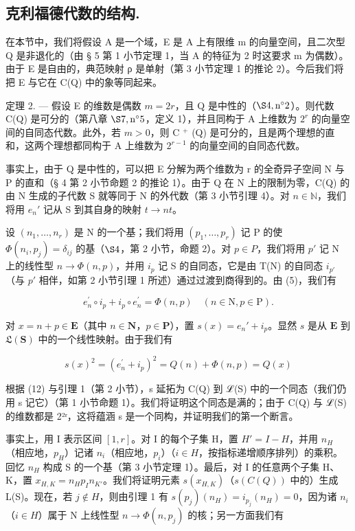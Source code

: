 \subsection{克利福德代数的结构.}

  在本节中，我们将假设 A 是一个域，E 是 A 上有限维 m 的向量空间，且二次型 Q 是非退化的（由 § 5 第 1 小节定理 1，当 A 的特征为 2 时这要求 m 为偶数）。由于 E 是自由的，典范映射 ρ 是单射（第 3 小节定理 1 的推论 2）。今后我们将把 E 与它在 C(Q) 中的象等同起来。

定理 2. --- 假设 E 的维数是偶数 \(m = 2r\)，且 Q 是中性的（\(\S 4, \text{n}^{\circ} 2\)）。则代数 C(Q) 是可分的（第八章 \(\S 7, \text{n}^{\circ} 5\)，定义 1），并且同构于 A 上维数为 \(2^{r}\) 的向量空间的自同态代数。此外，若 \(m > 0\)，则 C \(^{+}\) (Q) 是可分的，且是两个理想的直和，这两个理想都同构于 A 上维数为 \(2^{r-1}\) 的向量空间的自同态代数。

  事实上，由于 Q 是中性的，可以把 E 分解为两个维数为 r 的全奇异子空间 N 与 P 的直和（§ 4 第 2 小节命题 2 的推论 1）。由于 Q 在 N 上的限制为零，C(Q) 的由 N 生成的子代数 S 就等同于 N 的外代数（第 3 小节引理 4）。对 \(n \in \mathbb{N}\)，我们将用 \(e_n'\) 记从 S 到其自身的映射 \(t \to nt\)。

  设 \((n_{1},\ldots,n_{r})\) 是 N 的一个基；我们将用 \((p_{1},\ldots,p_{r})\) 记 P 的使 \(\Phi(n_{i},p_{j})=\delta_{ij}\) 的基（\(\S 4\)，第 2 小节，命题 2）。对 \(p\in P\)，我们将用 \(p'\) 记 N 上的线性型 \(n\to\Phi(n,p)\)，并用 \(i_{p}\) 记 S 的自同态，它是由 T(N) 的自同态 \(i_{p'}\)（与 \(p'\) 相伴，如第 2 小节引理 1 所述）通过过渡到商得到的。由 (5)，我们有

\[
e _ {n} ^ {\prime} \circ i _ {p} + i _ {p} \circ e _ {n} ^ {\prime} = \Phi (n, p) \quad (n \in \mathrm{N}, p \in \mathrm{P}).\tag{12}
\]

  对 \(x = n + p \in \mathbf{E}\)（其中 \(n \in \mathbf{N}\)，\(p \in \mathbf{P}\)），置 \(s(x) = e_n' + i_p\)。显然 \(s\) 是从 \(\mathbf{E}\) 到 \(\mathfrak{L}(\mathbf{S})\) 中的一个线性映射。由于我们有

\[
s (x) ^ {2} = \left(e _ {n} ^ {\prime} + i _ {p}\right) ^ {2} = Q (n) + \Phi (n, p) = Q (x)
\]

  根据 (12) 与引理 1（第 2 小节），s 延拓为 C(Q) 到 ℒ(S) 中的一个同态（我们仍用 s 记它）（第 1 小节命题 1）。我们将证明这个同态是满的；由于 C(Q) 与 ℒ(S) 的维数都是 2²ʳ，这将蕴涵 s 是一个同构，并证明我们的第一个断言。

  事实上，用 I 表示区间 \([1, r]\)。对 I 的每个子集 H，置 \(H' = I - H\)，并用 \(n_{H}\)（相应地，\(p_{H}\)）记诸 \(n_{i}\)（相应地，\(p_{i}\)）（\(i \in H\)，按指标递增顺序排列）的乘积。回忆 \(n_{H}\) 构成 S 的一个基（第 3 小节定理 1）。最后，对 I 的任意两个子集 H、K，置 \(x_{H,K} = n_{H}p_{I}n_{K'}\)。我们将证明元素 \(s(x_{H,K})\)（\(s(C(Q))\) 中的）生成 L(S)。现在，若 \(j \notin H\)，则由引理 1 有 \(s(p_{j})(n_{H}) = i_{p_{j}}(n_{H}) = 0\)，因为诸 \(n_{i}\)（\(i \in H\)）属于 N 上线性型 \(n \to \Phi(n, p_{j})\) 的核；另一方面我们有

